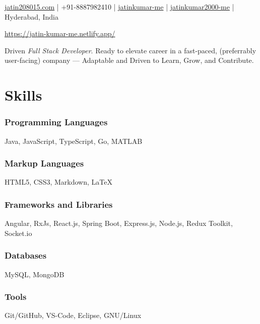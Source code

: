 \documentclass[a4paper]{article}
\author{Jatin Kumar}
\begin{document}
\begin{center}
	\makeatletter
	\centering {\huge \@author}
	\makeatother
	\vspace{6pt}

	\href{mailto:jatin208015\@gmail.com}{{\faAt} jatin208015\@gmail.com} |
	{\faPhone } +91-8887982410 |
	\href{https://github.com/jatinkumar-me}{{\faGithub} jatinkumar-me} |
	\href{https://www.linkedin.com/in/jatinkumar-2000-me/}{{\faLinkedin} {jatinkumar2000-me}} |
	{\faMapMarker} Hyderabad, India

	\href{https://jatin-kumar-me.netlify.app/}{{\faGlobe} https://jatin-kumar-me.netlify.app/}
\end{center}

\vspace{-13pt}
\hrulefill
\vspace{-8pt}

\begin{center}
Driven \textit{Full Stack Developer}. Ready to elevate career in a fast-paced, (preferrably user-facing) company — Adaptable and Driven to Learn, Grow, and Contribute.
\end{center}

\section{Skills}
\subsubsection*{Programming Languages}
Java, JavaScript, TypeScript, Go, MATLAB
\vspace{-10pt}
\subsubsection*{Markup Languages}
HTML5, CSS3, Markdown, \LaTeX
\vspace{-10pt}
\subsubsection*{Frameworks and Libraries}
Angular, RxJs, React.js, Spring Boot, Express.js, Node.js, Redux Toolkit, Socket.io
\vspace{-10pt}
\subsubsection*{Databases}
MySQL, MongoDB
\vspace{-10pt}
\subsubsection*{Tools}
Git/GitHub, VS-Code, Eclipse, GNU/Linux
\end{document}
